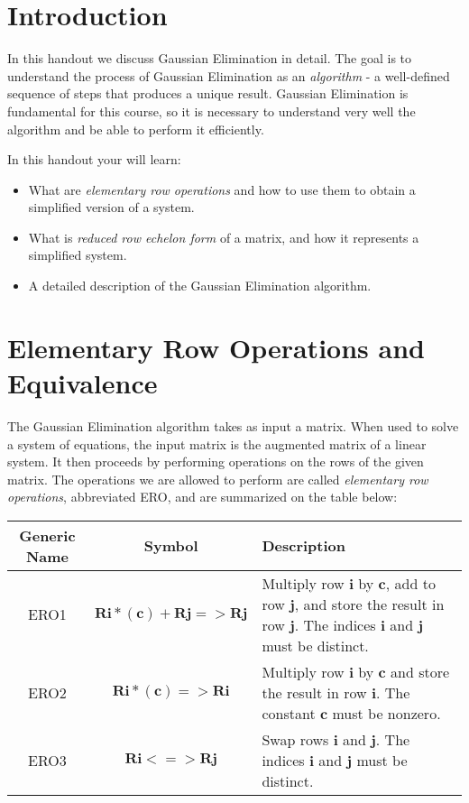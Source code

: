 \documentclass[12pt]{article}
\begin{document}
\section{Introduction}
In this handout we discuss Gaussian Elimination in detail. The goal is to understand the process of Gaussian Elimination as an \emph{algorithm} - a well-defined sequence of steps that produces a unique result. Gaussian Elimination is fundamental for this course, so it is necessary to understand very well the algorithm and be able to perform it efficiently.

In this handout your will learn:

\begin{itemize}
\item What are \emph{elementary row operations} and how to use them to obtain a simplified version of a system.
\item What is \emph{reduced row echelon form} of a matrix, and how it represents a simplified system.
\item A detailed description of the Gaussian Elimination algorithm. 
\end{itemize} 

\section{Elementary Row Operations and Equivalence}

The Gaussian Elimination algorithm takes as input a matrix. When used to solve a system of equations, the input matrix is the augmented matrix of a linear system. It then proceeds by performing operations on the rows of the given matrix. The operations we are allowed to perform are called \emph{elementary row operations}, abbreviated ERO, and are summarized on the table below:
\begin{center}
\begingroup
\renewcommand*{\arraystretch}{1.5}
\begin{tabular}{|c|c|p{3.5in}|}\hline
\textbf{Generic Name} & \textbf{Symbol} & \textbf{\hfill Description\hfill\hfill}\\\hline
ERO1 & $\mathbf{Ri*(c)+Rj=>Rj}$ & Multiply row $\mathbf{i}$ by $\mathbf{c}$, add to row $\mathbf{j}$, and store the result in row $\mathbf{j}$. The indices $\mathbf{i}$ and $\mathbf{j}$ must be distinct.\\\hline
ERO2 & $\mathbf{Ri*(c)=>Ri}$ & Multiply row $\mathbf{i}$ by $\mathbf{c}$ and store the result in row $\mathbf{i}$. The constant $\mathbf{c}$ must be nonzero.\\\hline
ERO3 & $\mathbf{Ri<=>Rj}$ & Swap rows $\mathbf{i}$ and $\mathbf{j}$. The indices $\mathbf{i}$ and $\mathbf{j}$ must be distinct.\\\hline
\end{tabular}
\endgroup
\end{center}
\end{document}
